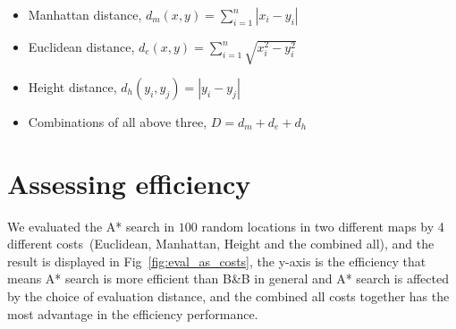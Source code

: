 \documentclass[11pt,oneside]{article}
\begin{document}
\begin{itemize}
  \item Manhattan distance, $d_m(x, y) = \sum_{i=1}^n |x_i - y_i|$
  \item Euclidean distance, $d_e(x, y) = \sum_{i=1}^n \sqrt{x^2_i - y^2_i}$
  \item Height distance, $d_h(y_i, y_j) = |y_i - y_j |$
  \item Combinations of all above three, $D = d_m + d_e + d_h$
\end{itemize}


\section{Assessing efficiency}
We evaluated the A* search in $100$ random locations in two different maps by 4 different costs~(Euclidean, Manhattan, Height and the combined all), and the result is displayed in Fig~\ref{fig:eval_as_costs}, the y-axis is the efficiency that means A* search is more efficient than B\&B in general and A* search is affected by the choice of evaluation distance, and the combined all costs together has the most advantage in the efficiency performance. 
\end{document}
